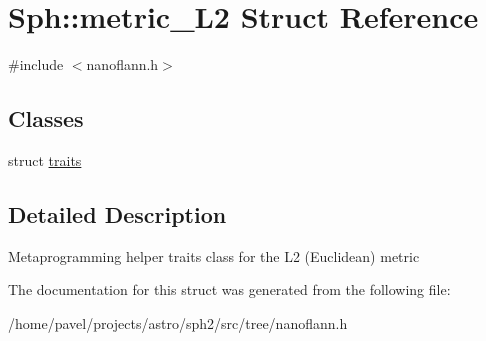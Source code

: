 \hypertarget{structSph_1_1metric__L2}{}\section{Sph\+:\+:metric\+\_\+\+L2 Struct Reference}
\label{structSph_1_1metric__L2}


{\ttfamily \#include $<$nanoflann.\+h$>$}

\subsection*{Classes}
\begin{DoxyCompactItemize}
\item 
struct \hyperlink{structSph_1_1metric__L2_1_1traits}{traits}
\end{DoxyCompactItemize}


\subsection{Detailed Description}
Metaprogramming helper traits class for the L2 (Euclidean) metric 

The documentation for this struct was generated from the following file\+:\begin{DoxyCompactItemize}
\item 
/home/pavel/projects/astro/sph2/src/tree/nanoflann.\+h\end{DoxyCompactItemize}
